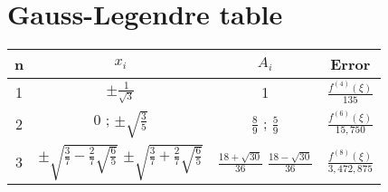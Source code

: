 \documentclass{llncs}
\begin{document}
\section{Gauss-Legendre table}
\label{app:gl}
\begin{tabular}{c|c|c|c}
n & $x_i$                                                                                                          & $A_i$                                                & Error                             \\ 
\hline                                                                                                                                                                                                         
1 & $\pm\frac{1}{\sqrt{3}}$                                                                                        & 1                                                    & $\frac{f^{(4)}(\xi)}{135}$        \\
2 & 0 ; $\pm \sqrt{\frac{3}{5}}$                                                                                   & $\frac{8}{9}$ ; $\frac{5}{9}$                        & $\frac{f^{(6)}(\xi)}{15,750}$     \\
3 & \parbox{5cm}{$\pm \sqrt{\frac{3}{7}-\frac{2}{7}\sqrt{\frac{6}{5}}}$ \\  $\pm \sqrt{\frac{3}{7}+\frac{2}{7}\sqrt{\frac{6}{5}}}$} & \parbox{5cm}{$\frac{18+\sqrt{30}}{36}$ \\ $\frac{18-\sqrt{30}}{36}$} & $\frac{f^{(8)}(\xi)}{3,472,875}$  \\
\end{tabular}
\end{document}
